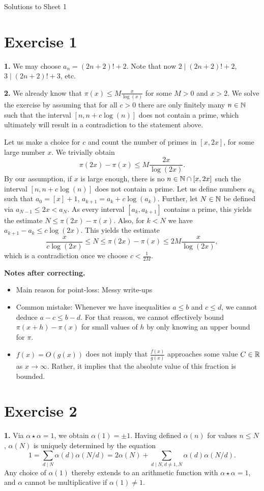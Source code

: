 \documentclass[a4paper,11pt]{article}
\begin{document}
\begin{center}
    \huge{Solutions to Sheet 1}
\end{center}

\section*{Exercise 1}
\textbf{1.} We may choose $a_n = (2n+2)!+2$. Note that now $2 \mid (2n+2)!+2$, 
$3 \mid (2n+2)!+3$, etc.

\textbf{2.} We already know that $\pi(x) \leq M \frac{x}{\log(x)}$ for some $M > 0$ 
and $x > 2$. We solve the exercise by assuming that for all $c>0$ there are only
finitely many $n \in \mathbb{N}$ such that the interval $[n, n+c \log(n)]$ does not
contain a prime, which ultimately will result in a contradiction to the statement above.

Let us make a choice for $c$ and count the number of primes in $[x, 2x]$, for
some large number $x$. We trivially obtain 
\[
    \pi(2x)-\pi(x) \leq M \frac{2x}{\log(2x)}.
\]
By our assumption, if $x$ is large enough, there is no $n\in \mathbb{N} \cap[x, 2x]$ such the 
interval $[n, n + c \log(n)]$ does not contain a prime. Let us define numbers 
$a_k$ such that $a_0 = [x]+1$, $a_{k+1} = a_k + c \log(a_k)$. Further, let 
$N\in \mathbb{N}$ be defined via $a_{N-1} \leq 2x < a_N$. As every interval 
$[a_k, a_{k+1}]$ contains a prime, this yields the estimate $N \leq \pi(2x)-\pi(x)$. 
Also, for $k < N$ we have $a_{k+1}-a_k \leq c \log(2x)$.  
This yields the estimate
\[
    \frac x{c \log(2x)} \leq N \leq \pi(2x) - \pi(x)  \leq 2M \frac{x}{\log(2x)},
\]
which is a contradiction once we choose $c < \frac 1{2M}$.

\textbf{Notes after correcting.} \leavevmode
\begin{itemize}
    \item Main reason for point-loss: Messy write-ups
    \item Common mistake: Whenever we have inequalities $a \leq b$ and $c \leq d$, 
        we cannot deduce $a - c \leq b - d$. For that reason, we cannot effectively 
        bound $\pi(x+h) - \pi(x)$ for small values of $h$ by only knowing an upper 
        bound for $\pi$. 
    \item $f(x) = O(g(x))$ does not imply that $\frac{f(x)}{g(x)}$ approaches some value
        $C \in \mathbb{R}$ as $x \to \infty$. Rather, it implies that the absolute
        value of this fraction is bounded.
\end{itemize}

\section*{Exercise 2}
\textbf{1.} 
Via $\alpha \star \alpha = 1$, we obtain $\alpha(1) = \pm 1$. Having defined 
$\alpha(n)$ for values $n \leq N$, $\alpha(N)$ is uniquely determined by the equation
$$1 = \sum_{d \mid N} \alpha(d)\alpha(N/d) = 2 \alpha(N) + \sum_{d \mid N, d
\neq 1, N} \alpha(d) \alpha(N/d).$$
Any choice of $\alpha(1)$ thereby extends to an arithmetic function with
$\alpha \star \alpha  = 1$, and $\alpha$ cannot be multiplicative if $\alpha(1)
\neq 1$. 
\end{document}
